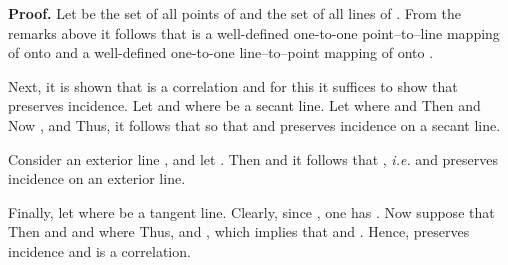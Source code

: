 \documentclass[a4paper,twoside,12pt]{article}
\newenvironment{proof}{\medskip \noindent 
            {\bf Proof.}}{ \hfill \myHighlight{$\square$}\coordHE{} \medskip}
\begin{document}
\begin{proof} Let \coordHE{} be the set of all points of \myHighlight{$\Pi$}\coordHE{} and 
\coordHE{} the set of all lines of \myHighlight{$\Pi$}\coordHE{}. From the remarks above
it follows that \myHighlight{$\Phi$}\coordHE{} is a well-defined one-to-one point--to--line mapping
of \coordHE{} onto \coordHE{} and a well-defined one-to-one
line--to--point mapping of \coordHE{} onto \coordHE{}. 

     Next, it is shown that \myHighlight{$\Phi$}\coordHE{} is a correlation and for this it 
suffices to show that \myHighlight{$\Phi$}\coordHE{} preserves incidence. Let 
\coordHE{} and \coordHE{}
where \coordHE{} be a secant line. Let 
\coordHE{} where 
\coordHE{} and 
\coordHE{} Then \coordHE{} and \coordHE{} Now 
\coordHE{}  \coordHE{} 
\coordHE{}, and \coordHE{} Thus, it follows that 
\coordHE{} so that 
\coordHE{} 
and \myHighlight{$\Phi$}\coordHE{} preserves incidence on a secant line.

     Consider an exterior line \coordHE{}, and let 
\coordHE{}. Then \coordHE{} and it follows that 
\coordHE{}, {\it i.e.} 
\coordHE{} and \myHighlight{$\Phi$}\coordHE{} preserves incidence
on an exterior line.

     Finally, let \coordHE{} where \coordHE{} be a tangent line. Clearly, since 
\coordHE{}, one has 
\coordHE{}. 
Now suppose that \coordHE{} Then \coordHE{} and
\coordHE{} and \coordHE{} 
where \coordHE{} Thus, \coordHE{} 
and \coordHE{}, which implies that \coordHE{} 
and \coordHE{}. Hence, \myHighlight{$\Phi$}\coordHE{}
preserves incidence and is a correlation.
\end{proof}
\end{document}
